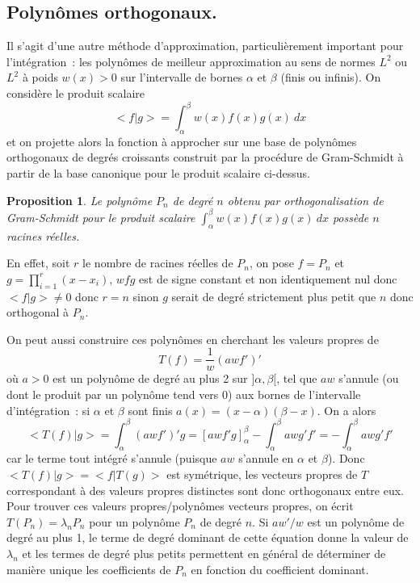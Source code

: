 \documentclass[a4paper,11pt]{book}
\newtheorem{prop}[thm]{Proposition}
\begin{document}
\begin{giacjshere}
\section{Polynômes orthogonaux.}
Il s'agit d'une autre m\'ethode d'approximation, 
particuli\`erement important pour l'int\'egration~: les polyn\^omes
de meilleur approximation au sens de normes $L^2$ ou $L^2$
\`a poids $w(x)>0$ sur l'intervalle de bornes $\alpha$ et $\beta$
(finis ou infinis). 
On consid\`ere le produit scalaire
$$ <f|g>=\int_\alpha^\beta w(x) f(x)g(x) \ dx$$
et on projette alors la fonction \`a approcher 
sur une base de polyn\^omes orthogonaux
de degr\'es croissants construit par la proc\'edure
de Gram-Schmidt \`a partir de la base canonique
pour le produit scalaire ci-dessus.

\begin{prop}
Le polyn\^ome $P_n$ de degr\'e $n$
obtenu par orthogonalisation de Gram-Schmidt
pour le produit scalaire $\int_\alpha^\beta w(x) f(x)g(x) \ dx$
poss\`ede $n$ racines r\'eelles.
\end{prop}
En effet, soit $r$ le nombre de racines r\'eelles de $P_n$, on pose $f=P_n$ et 
$g=\prod_{i=1}^r (x-x_i)$, $wfg$ est de signe constant
et non identiquement nul donc $<f|g> \neq 0$ donc
$r=n$ sinon $g$ serait de degr\'e strictement plus petit que $n$
donc orthogonal \`a $P_n$.

On peut aussi construire ces polyn\^omes en cherchant les valeurs
propres de
$$ T(f)=\frac{1}{w} (awf')'$$
o\`u $a>0$ est un polyn\^ome de degr\'e au plus 2
sur $]\alpha,\beta[$, tel que $aw$ s'annule (ou dont le produit
par un polyn\^ome tend vers 0) 
aux bornes de l'intervalle d'int\'egration~: si $\alpha$ et $\beta$ sont finis
$a(x)=(x-\alpha)(\beta-x)$.
On a alors
$$ <T(f)|g>=\int_\alpha^\beta (awf')'g =
[awf'g]_\alpha^\beta-\int_\alpha^\beta awg'f'
=-\int_\alpha^\beta awg'f'$$
car le terme tout int\'egr\'e s'annule 
(puisque $aw$ s'annule en $\alpha$ et $\beta$). Donc $<T(f)|g>=<f|T(g)>$
est sym\'etrique, les vecteurs propres de $T$ correspondant \`a des
valeurs propres distinctes sont donc orthogonaux entre eux.
Pour trouver ces valeurs propres/polyn\^omes vecteurs propres, on
\'ecrit $T(P_n)=\lambda_n P_n$ pour un polyn\^ome $P_n$ de degr\'e
$n$. Si $aw'/w$ est un polyn\^ome de degr\'e au plus 1, 
le terme de degr\'e dominant de cette \'equation
donne la valeur de $\lambda_n$ et les termes de degr\'e plus petits
permettent en g\'en\'eral de d\'eterminer de mani\`ere unique les
coefficients de $P_n$ en fonction du coefficient dominant.


\end{giacjshere}
\end{document}
